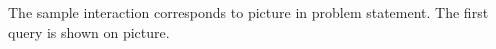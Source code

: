 The sample interaction corresponds to picture in problem statement. The first query is shown on picture. 